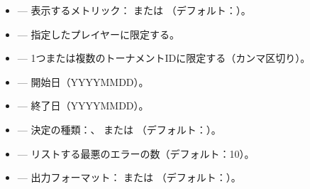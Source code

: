 \documentclass[letterpaper,10pt,dvipdfmx]{sphinxmanual}
\begin{document}
\sphinxAtStartPar
{}
\begin{itemize}
\item {} 
\sphinxAtStartPar
{} — 表示するメトリック： または （デフォルト：）。

\item {} 
\sphinxAtStartPar
{} — 指定したプレイヤーに限定する。

\item {} 
\sphinxAtStartPar
{} — 1つまたは複数のトーナメントIDに限定する（カンマ区切り）。

\item {} 
\sphinxAtStartPar
{} — 開始日（YYYY\sphinxhyphen{}MM\sphinxhyphen{}DD）。

\item {} 
\sphinxAtStartPar
{} — 終了日（YYYY\sphinxhyphen{}MM\sphinxhyphen{}DD）。

\item {} 
\sphinxAtStartPar
{} — 決定の種類：、 または （デフォルト：）。

\item {} 
\sphinxAtStartPar
{} — リストする最悪のエラーの数（デフォルト：10）。

\item {} 
\sphinxAtStartPar
{} — 出力フォーマット： または （デフォルト：）。

\end{itemize}

\sphinxAtStartPar
{}
\end{document}
